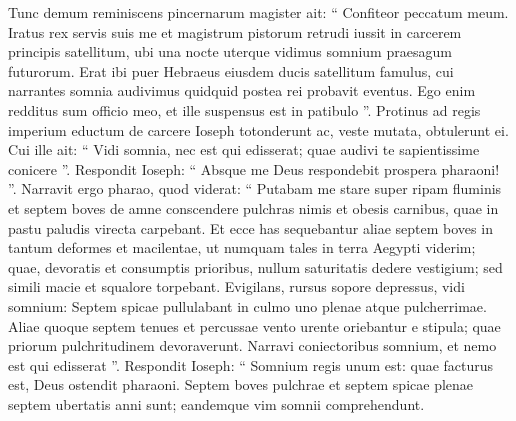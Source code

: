 \begin{biblechapter}
\begin{biblechapter}
\begin{biblechapter}
\begin{biblechapter}
\begin{biblechapter}
\begin{biblechapter}
\begin{biblechapter}
\begin{biblechapter}
\begin{biblechapter}
\begin{biblechapter}
\begin{biblechapter}
\begin{biblechapter}
\begin{biblechapter}
\begin{biblechapter}
\begin{biblechapter}
\begin{biblechapter}
\begin{biblechapter}
\begin{biblechapter}
\begin{biblechapter}
\begin{biblechapter}
\begin{biblechapter}
\begin{biblechapter}
\begin{biblechapter}
\begin{biblechapter}
\begin{biblechapter}
\begin{biblechapter}
\begin{biblechapter}
\begin{biblechapter}
\begin{biblechapter}
\begin{biblechapter}
\begin{biblechapter}
\begin{biblechapter}
\begin{biblechapter}
\begin{biblechapter}
\begin{biblechapter}
\begin{biblechapter}
\begin{biblechapter}
\begin{biblechapter}
\begin{biblechapter}
\begin{biblechapter}
\begin{biblechapter}
\verse Tunc demum reminiscens pincernarum magister ait: “ Confiteor peccatum meum. 
\verse Iratus rex servis suis me et magistrum pistorum retrudi iussit in carcerem principis satellitum, 
\verse ubi una nocte uterque vidimus somnium praesagum futurorum. 
\verse Erat ibi puer Hebraeus eiusdem ducis satellitum famulus, cui narrantes somnia 
\verse audivimus quidquid postea rei probavit eventus. Ego enim redditus sum officio meo, et ille suspensus est in patibulo ”.
 \verse Protinus ad regis imperium eductum de carcere Ioseph totonderunt ac, veste mutata, obtulerunt ei. 
\verse Cui ille ait: “ Vidi somnia, nec est qui edisserat; quae audivi te sapientissime conicere ”. 
\verse Respondit Ioseph: “ Absque me Deus respondebit prospera pharaoni! ”.
 \verse Narravit ergo pharao, quod viderat: “ Putabam me stare super ripam fluminis 
\verse et septem boves de amne conscendere pulchras nimis et obesis carnibus, quae in pastu paludis virecta carpebant. 
\verse Et ecce has sequebantur aliae septem boves in tantum deformes et macilentae, ut numquam tales in terra Aegypti viderim; 
\verse quae, devoratis et consumptis prioribus, 
\verse nullum saturitatis dedere vestigium; sed simili macie et squalore torpebant. Evigilans, rursus sopore depressus, 
\verse vidi somnium: Septem spicae pullulabant in culmo uno plenae atque pulcherrimae. 
\verse Aliae quoque septem tenues et percussae vento urente oriebantur e stipula; 
\verse quae priorum pulchritudinem devoraverunt. Narravi coniectoribus somnium, et nemo est qui edisserat ”.
 \verse Respondit Ioseph: “ Somnium regis unum est: quae facturus est, Deus ostendit pharaoni. 
\verse Septem boves pulchrae et septem spicae plenae septem ubertatis anni sunt; eandemque vim somnii comprehendunt. 

\end{biblechapter}
\end{biblechapter}
\end{biblechapter}
\end{biblechapter}
\end{biblechapter}
\end{biblechapter}
\end{biblechapter}
\end{biblechapter}
\end{biblechapter}
\end{biblechapter}
\end{biblechapter}
\end{biblechapter}
\end{biblechapter}
\end{biblechapter}
\end{biblechapter}
\end{biblechapter}
\end{biblechapter}
\end{biblechapter}
\end{biblechapter}
\end{biblechapter}
\end{biblechapter}
\end{biblechapter}
\end{biblechapter}
\end{biblechapter}
\end{biblechapter}
\end{biblechapter}
\end{biblechapter}
\end{biblechapter}
\end{biblechapter}
\end{biblechapter}
\end{biblechapter}
\end{biblechapter}
\end{biblechapter}
\end{biblechapter}
\end{biblechapter}
\end{biblechapter}
\end{biblechapter}
\end{biblechapter}
\end{biblechapter}
\end{biblechapter}
\end{biblechapter}
